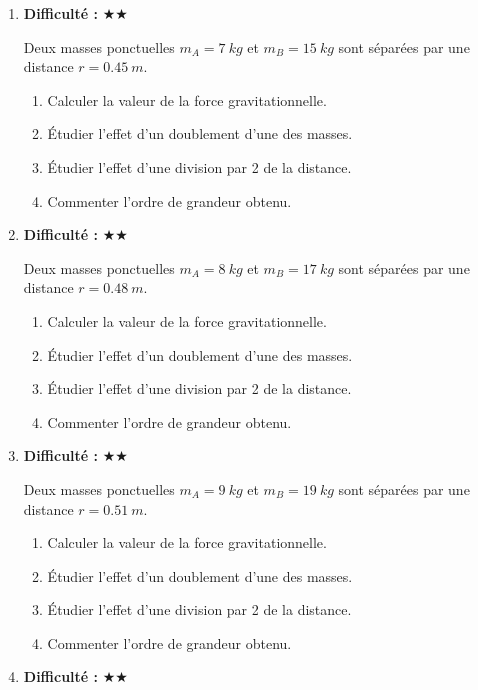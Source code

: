 \documentclass[11pt,a4paper]{article}
\newcommand{\etoiles}[1]{\textbf{Difficulté : }#1}
\begin{document}
\begin{enumerate}[label=\textbf{Exercice \arabic*.},leftmargin=*]
Deux masses ponctuelles $m_A=6\ \si{kg}$ et $m_B=13\ \si{kg}$ sont séparées par une distance $r=0.42\ \si{m}$.
\begin{enumerate}[label=\alph*)]
\item Calculer la valeur de la force gravitationnelle.
\item Étudier l'effet d'un doublement d'une des masses.
\item Étudier l'effet d'une division par 2 de la distance.
\item Commenter l'ordre de grandeur obtenu.
\end{enumerate}
\item \etoiles{★★}

Deux masses ponctuelles $m_A=7\ \si{kg}$ et $m_B=15\ \si{kg}$ sont séparées par une distance $r=0.45\ \si{m}$.
\begin{enumerate}[label=\alph*)]
\item Calculer la valeur de la force gravitationnelle.
\item Étudier l'effet d'un doublement d'une des masses.
\item Étudier l'effet d'une division par 2 de la distance.
\item Commenter l'ordre de grandeur obtenu.
\end{enumerate}
\item \etoiles{★★}

Deux masses ponctuelles $m_A=8\ \si{kg}$ et $m_B=17\ \si{kg}$ sont séparées par une distance $r=0.48\ \si{m}$.
\begin{enumerate}[label=\alph*)]
\item Calculer la valeur de la force gravitationnelle.
\item Étudier l'effet d'un doublement d'une des masses.
\item Étudier l'effet d'une division par 2 de la distance.
\item Commenter l'ordre de grandeur obtenu.
\end{enumerate}
\item \etoiles{★★}

Deux masses ponctuelles $m_A=9\ \si{kg}$ et $m_B=19\ \si{kg}$ sont séparées par une distance $r=0.51\ \si{m}$.
\begin{enumerate}[label=\alph*)]
\item Calculer la valeur de la force gravitationnelle.
\item Étudier l'effet d'un doublement d'une des masses.
\item Étudier l'effet d'une division par 2 de la distance.
\item Commenter l'ordre de grandeur obtenu.
\end{enumerate}
\item \etoiles{★★}


\end{enumerate}
\end{document}
